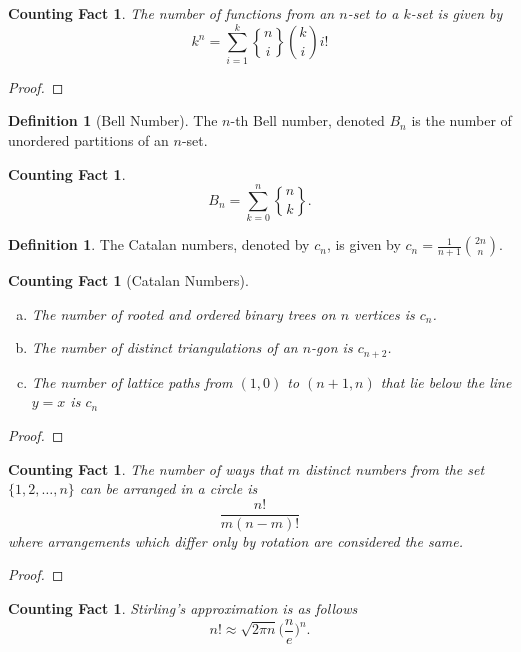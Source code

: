 \documentclass[12]{article}
\newcounter{countingFactCounter}
\newtheorem{countingFact}[countingFactCounter]{Counting Fact}
\theoremstyle{definition}
\newtheorem{defn}[thm]{Definition} %
\begin{document}
	\begin{countingFact}
		The number of functions from an $n$-set to a $k$-set is given by
		$$k^n = \sum_{i=1}^k {n \brace i}{k \choose i}i!$$
	\end{countingFact}
	\begin{proof}
		
	\end{proof}

	\begin{defn}[Bell Number]
		The $n$-th Bell number, denoted $B_n$ is the number of unordered partitions of an $n$-set.
	\end{defn}

	\begin{countingFact}
		$$B_n = \sum_{k=0}^n {n \brace k}.$$
	\end{countingFact}

	\begin{defn}
		The Catalan numbers, denoted by $c_n$, is given by $c_n = \frac{1}{n+1}{2n \choose n}$.
	\end{defn}

	\begin{countingFact}[Catalan Numbers]
		\
		\begin{enumerate}[a)]
			\item The number of rooted and ordered binary trees on $n$ vertices is $c_n$.
			\item The number of distinct triangulations of an $n$-gon is $c_{n+2}$.
			\item The number of lattice paths from $(1,0)$ to $(n+1,n)$ that lie below the line $y = x$ is $c_n$
		\end{enumerate}
	\end{countingFact}
	\begin{proof}
		
	\end{proof}

	\begin{countingFact}
		The number of ways that $m$ distinct numbers from the set $\{1, 2, \ldots, n\}$ can be arranged in a circle is
		$$\frac{n!}{m(n-m)!}$$
		where arrangements which differ only by rotation are considered the same.
	\end{countingFact}
	\begin{proof}
		
	\end{proof}

	\begin{countingFact}
		Stirling's approximation is as follows
		$$n! \approx \sqrt{2\pi n}\biggr( \frac{n}{e} \biggr)^n.$$
	\end{countingFact}
\end{document}
